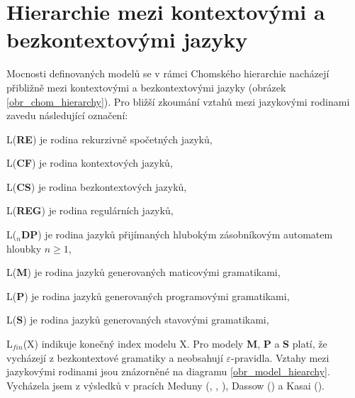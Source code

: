 \section{Hierarchie mezi kontextovými a bezkontextovými jazyky} \label{kap_teorie_hierarchie}


Mocnosti definovaných modelů se v rámci Chomského hierarchie nacházejí přibližně mezi kontextovými a bezkontextovými jazyky (obrázek \ref{obr_chom_hierarchy}). Pro bližší zkoumání vztahů mezi jazykovými rodinami zavedu následující označení:

\begin{description*}
\item{L(\textbf{RE})} je rodina rekurzivně spočetných jazyků,
\item{L(\textbf{CF})} je rodina kontextových jazyků,
\item{L(\textbf{CS})} je rodina bezkontextových jazyků,
\item{L(\textbf{REG})} je rodina regulárních jazyků,

\item{L(\textbf{${}_n$DP})} je rodina jazyků přijímaných hlubokým zásobníkovým automatem hloubky $n \ge 1$,

\item{L(\textbf{M})} je rodina jazyků generovaných maticovými gramatikami,
\item{L(\textbf{P})} je rodina jazyků generovaných programovými gramatikami,
\item{L(\textbf{S})} je rodina jazyků generovaných stavovými gramatikami,

\end{description*}

L${}_{fin}$(X) indikuje konečný index modelu X. Pro modely \textbf{M}, \textbf{P} a \textbf{S} platí, že vycházejí z bezkontextové gramatiky a neobsahují $\varepsilon$-pravidla.
Vztahy mezi jazykovými rodinami jsou znázorněné na diagramu \ref{obr_model_hiearchy}. Vycházela jsem z výsledků v pracích
Meduny (\cite{Meduna:DeepPDA}, \cite{Meduna:FinitelyDeepPDA}, \cite{Meduna:StateGrammars}), 
Dassow (\cite{Dassow:RegulatedRewriting}) a 
Kasai (\cite{Kasai:Hierarchy}).








